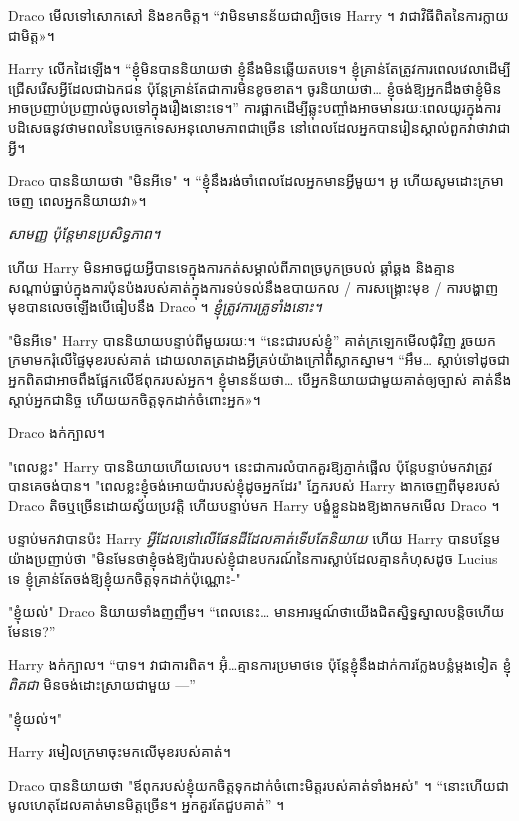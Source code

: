 Draco មើលទៅសោកសៅ និងខកចិត្ត។ “វាមិនមានន័យជាល្បិចទេ Harry ។ វា​ជា​វិធី​ពិត​នៃ​ការ​ក្លាយ​ជា​មិត្ត»។

Harry លើកដៃឡើង។ “ខ្ញុំ​មិន​បាន​និយាយ​ថា ខ្ញុំ​នឹង​មិន​ឆ្លើយ​តប​ទេ។ ខ្ញុំ​គ្រាន់​តែ​ត្រូវ​ការ​ពេល​វេលា​ដើម្បី​ជ្រើស​រើស​អ្វី​ដែល​ជា​ឯកជន ប៉ុន្តែ​គ្រាន់​តែ​ជា​ការ​មិន​ខូច​ខាត។ ចូរនិយាយថា… ខ្ញុំចង់ឱ្យអ្នកដឹងថាខ្ញុំមិនអាចប្រញាប់ប្រញាល់ចូលទៅក្នុងរឿងនោះទេ។” ការផ្អាកដើម្បីឆ្លុះបញ្ចាំងអាចមានរយៈពេលយូរក្នុងការបដិសេធនូវថាមពលនៃបច្ចេកទេសអនុលោមភាពជាច្រើន នៅពេលដែលអ្នកបានរៀនស្គាល់ពួកវាថាវាជាអ្វី។

Draco បាននិយាយថា "មិនអីទេ" ។ “ខ្ញុំ​នឹង​រង់​ចាំ​ពេល​ដែល​អ្នក​មាន​អ្វី​មួយ។ អូ ហើយ​សូម​ដោះ​ក្រមា​ចេញ ពេល​អ្នក​និយាយ​វា​»។

\emph{សាមញ្ញ ប៉ុន្តែមានប្រសិទ្ធភាព។}

ហើយ Harry មិន​អាច​ជួយ​អ្វី​បាន​ទេ​ក្នុង​ការ​កត់​សម្គាល់​ពី​ភាព​ច្របូកច្របល់ ឆ្គាំឆ្គង និង​គ្មាន​សណ្ដាប់ធ្នាប់​ក្នុង​ការ​ប៉ុនប៉ង​របស់​គាត់​ក្នុង​ការ​ទប់ទល់​នឹង​ឧបាយកល / ការ​សង្គ្រោះ​មុខ / ការ​បង្ហាញ​មុខ​បាន​លេច​ឡើង​បើ​ធៀប​នឹង Draco ។ \emph{ខ្ញុំត្រូវការគ្រូទាំងនោះ។}

"មិនអីទេ" Harry បាននិយាយបន្ទាប់ពីមួយរយៈ។ “នេះជារបស់ខ្ញុំ” គាត់​ក្រឡេក​មើល​ជុំវិញ រួច​យក​ក្រមា​មក​រុំ​លើ​ផ្ទៃ​មុខ​របស់​គាត់ ដោយ​លាត​ត្រដាង​អ្វី​គ្រប់​យ៉ាង​ក្រៅ​ពី​ស្លាកស្នាម។ “អឹម… ស្តាប់ទៅដូចជាអ្នកពិតជាអាចពឹងផ្អែកលើឪពុករបស់អ្នក។ ខ្ញុំ​មាន​ន័យ​ថា… បើ​អ្នក​និយាយ​ជាមួយ​គាត់​ឲ្យ​ច្បាស់ គាត់​នឹង​ស្តាប់​អ្នក​ជានិច្ច ហើយ​យក​ចិត្ត​ទុក​ដាក់​ចំពោះ​អ្នក»។

Draco ងក់ក្បាល។

"ពេលខ្លះ" Harry បាននិយាយហើយលេប។ នេះ​ជា​ការ​លំបាក​គួរ​ឱ្យ​ភ្ញាក់​ផ្អើល ប៉ុន្តែ​បន្ទាប់​មក​វា​ត្រូវ​បាន​គេ​ចង់​បាន​។ "ពេលខ្លះខ្ញុំចង់អោយប៉ារបស់ខ្ញុំដូចអ្នកដែរ" ភ្នែករបស់ Harry ងាកចេញពីមុខរបស់ Draco តិចឬច្រើនដោយស្វ័យប្រវត្តិ ហើយបន្ទាប់មក Harry បង្ខំខ្លួនឯងឱ្យងាកមកមើល Draco ។

បន្ទាប់មកវាបានប៉ះ Harry \emph{អ្វីដែលនៅលើផែនដីដែលគាត់ទើបតែនិយាយ} ហើយ Harry បានបន្ថែមយ៉ាងប្រញាប់ថា "មិនមែនថាខ្ញុំចង់ឱ្យប៉ារបស់ខ្ញុំជាឧបករណ៍នៃការស្លាប់ដែលគ្មានកំហុសដូច Lucius ទេ ខ្ញុំគ្រាន់តែចង់ឱ្យខ្ញុំយកចិត្តទុកដាក់ប៉ុណ្ណោះ-"

"ខ្ញុំយល់" Draco និយាយទាំងញញឹម។ “ពេលនេះ… មានអារម្មណ៍ថាយើងជិតស្និទ្ធស្នាលបន្តិចហើយមែនទេ?”

Harry ងក់ក្បាល។ “បាទ។ វាជាការពិត។ អ៊ុំ…គ្មានការប្រមាថទេ ប៉ុន្តែខ្ញុំនឹងដាក់ការក្លែងបន្លំម្តងទៀត ខ្ញុំ\emph{ពិតជា} មិនចង់ដោះស្រាយជាមួយ —”

"ខ្ញុំយល់។"

Harry រមៀល​ក្រមា​ចុះ​មក​លើ​មុខ​របស់​គាត់។

Draco បាននិយាយថា "ឪពុករបស់ខ្ញុំយកចិត្តទុកដាក់ចំពោះមិត្តរបស់គាត់ទាំងអស់" ។ “នោះហើយជាមូលហេតុដែលគាត់មានមិត្តច្រើន។ អ្នកគួរតែជួបគាត់” ។

